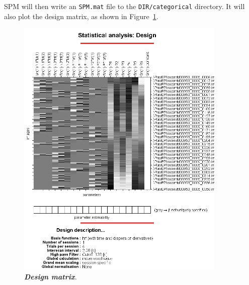 SPM will then write an \texttt{SPM.mat} file to the \texttt{DIR/categorical} directory. It will also plot the design matrix, as shown in Figure~\ref{cat_design}. 
\begin{figure}
\begin{center}
\includegraphics[width=100mm]{faces/cat_design}
\caption{\em \textbf{Design matrix}. \label{cat_design}}
\end{center}
\end{figure}

